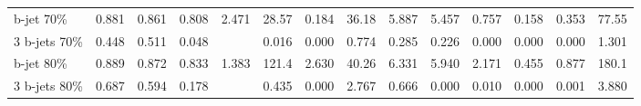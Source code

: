 \begin{table}
\begin{center}
{\begin{tabular}{l||cccc||cc|ccc|ccc||c }
            b-jet  70\%   &        0.881 &        0.861 &        0.808 &      2.471 &       28.57  &        0.184 &       36.18  &        5.887 &        5.457 &        0.757 &        0.158 &        0.353 &       77.55     \\        
            3 b-jets 70\% &        0.448 &        0.511 &        0.048 &            &        0.016 &        0.000 &        0.774 &        0.285 &        0.226 &        0.000 &        0.000 &        0.000 &        1.301    \\\hline  
                                                                                                                                                                                                                      
            b-jet 80\%    &        0.889 &        0.872 &        0.833 &      1.383 &      121.4   &        2.630 &       40.26  &        6.331 &        5.940 &        2.171 &        0.455 &        0.877 &      180.1      \\        
            3 b-jets 80\% &        0.687 &        0.594 &        0.178 &            &        0.435 &        0.000 &        2.767 &        0.666 &        0.000 &        0.010 &        0.000 &        0.001 &        3.880    \\\hline  
                                                                                                                                                                                                                      

\end{tabular}}
\end{center}
\end{table}
